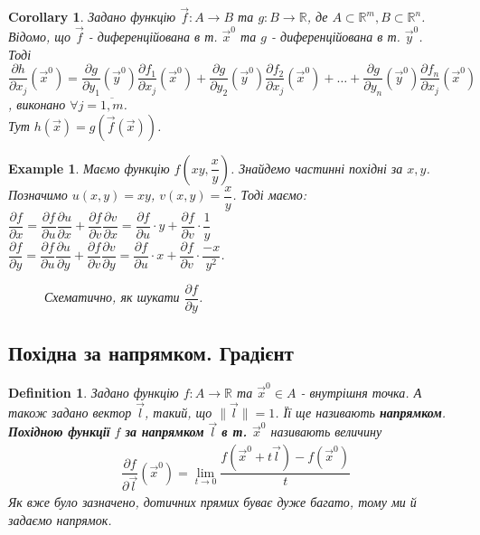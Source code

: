 \documentclass[a4paper, 10pt]{article}
\def\departial#1#2{\dfrac{\partial {#1}}{\partial {#2}}}
\theoremstyle{theoremdd}
\theoremstyle{theoremdd}
\theoremstyle{theoremdd}
\newtheorem{definition}[theorem]{Definition}
\theoremstyle{theoremdd}
\theoremstyle{theoremdd}
\newtheorem{example}[theorem]{Example}
\theoremstyle{theoremdd}
\theoremstyle{theoremdd}
\theoremstyle{theoremdd}
\theoremstyle{theoremdd}
\newtheorem{corollary}[theorem]{Corollary}
\newcommand\Norm[1]{\lVert#1\rVert}
\begin{document}
\begin{corollary}
Задано функцію $\vec{f}: A \to B$ та $g: B \to \mathbb{R}$, де $A \subset \mathbb{R}^m, B \subset \mathbb{R}^n$.\\
Відомо, що $\vec{f}$ - диференційована в т. $\vec{x}^0$ та $g$ - диференційована в т. $\vec{y}^0$.\\
Тоді $\departial{h}{x_j}(\vec{x}^0) = \departial{g}{y_1}(\vec{y}^0) \departial{f_1}{x_j}(\vec{x}^0) + \departial{g}{y_2}(\vec{y}^0) \departial{f_2}{x_j}(\vec{x}^0) + \dots + \departial{g}{y_n}(\vec{y}^0) \departial{f_n}{x_j}(\vec{x}^0)$, виконано $\forall j = \overline{1,m}$.\\
Тут $h(\vec{x}) = g(\vec{f}(\vec{x}))$.
\end{corollary}

\begin{example}
Маємо функцію $f\left( xy, \dfrac{x}{y} \right)$. Знайдемо частинні похідні за $x,y$.\\
Позначимо $u(x,y) = xy$, $v(x,y) = \dfrac{x}{y}$. Тоді маємо:\\
$\departial{f}{x} = \departial{f}{u} \departial{u}{x} + \departial{f}{v} \departial{v}{x} = \departial{f}{u} \cdot y + \departial{f}{v} \cdot \dfrac{1}{y}$\\
$\departial{f}{y} = \departial{f}{u} \departial{u}{y} + \departial{f}{v} \departial{v}{y} = \departial{f}{u} \cdot x + \departial{f}{v} \cdot \dfrac{-x}{y^2}$.
\begin{figure}[H]
\centering
{}
\caption*{Схематично, як шукати $\departial{f}{y}$.}
\end{figure}
\end{example}

\subsection{Похідна за напрямком. Градієнт}
\begin{definition}
Задано функцію $f: A \to \mathbb{R}$ та $\vec{x}^0 \in A$ - внутрішня точка. А також задано вектор $\vec{l}$, такий, що $\Norm{\vec{l}} = 1$. Її ще називають \textbf{напрямком}.\\
\textbf{Похідною функції} $f$ \textbf{за напрямком} $\vec{l}$ \textbf{в т. $\vec{x}^0$} називають величину
\begin{align*}
\dfrac{\partial f}{\partial \vec{l}} (\vec{x}^0) = \lim_{t \to 0} \dfrac{f(\vec{x}^0+t \vec{l}) - f(\vec{x}^0)}{t}
\end{align*}
Як вже було зазначено, дотичних прямих буває дуже багато, тому ми й задаємо напрямок.
\end{definition}
\end{document}
